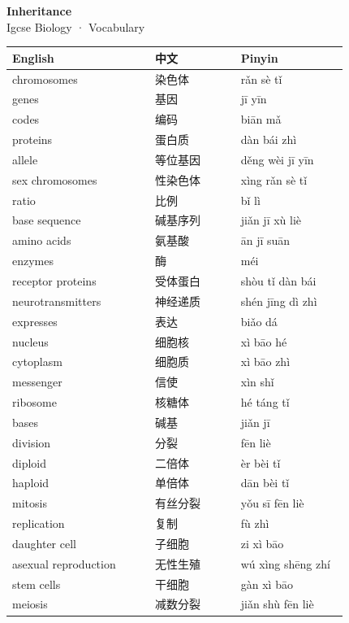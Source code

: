 \documentclass[11pt]{article}
\begin{document}
\begin{center}
  {\LARGE\bfseries Inheritance}\\[0.35em]
  {\large Igcse Biology · Vocabulary}
\end{center}
\vspace{0.6em}

\begin{longtable}{@{}p{0.40\linewidth}p{0.24\linewidth}p{0.30\linewidth}@{}}
\toprule
\textbf{English} & \textbf{中文} & \textbf{Pinyin} \\
\midrule
\endhead
\bottomrule
\endlastfoot
chromosomes & 染色体 & rǎn sè tǐ \\
genes & 基因 & jī yīn \\
codes & 编码 & biān mǎ \\
proteins & 蛋白质 & dàn bái zhì \\
allele & 等位基因 & děng wèi jī yīn \\
sex chromosomes & 性染色体 & xìng rǎn sè tǐ \\
ratio & 比例 & bǐ lì \\
base sequence & 碱基序列 & jiǎn jī xù liè \\
amino acids & 氨基酸 & ān jī suān \\
enzymes & 酶 & méi \\
receptor proteins & 受体蛋白 & shòu tǐ dàn bái \\
neurotransmitters & 神经递质 & shén jīng dì zhì \\
expresses & 表达 & biǎo dá \\
nucleus & 细胞核 & xì bāo hé \\
cytoplasm & 细胞质 & xì bāo zhì \\
messenger & 信使 & xìn shǐ \\
ribosome & 核糖体 & hé táng tǐ \\
bases & 碱基 & jiǎn jī \\
division & 分裂 & fēn liè \\
diploid & 二倍体 & èr bèi tǐ \\
haploid & 单倍体 & dān bèi tǐ \\
mitosis & 有丝分裂 & yǒu sī fēn liè \\
replication & 复制 & fù zhì \\
daughter cell & 子细胞 & zi xì bāo \\
asexual reproduction & 无性生殖 & wú xìng shēng zhí \\
stem cells & 干细胞 & gàn xì bāo \\
meiosis & 减数分裂 & jiǎn shù fēn liè \\

\end{longtable}
\end{document}
